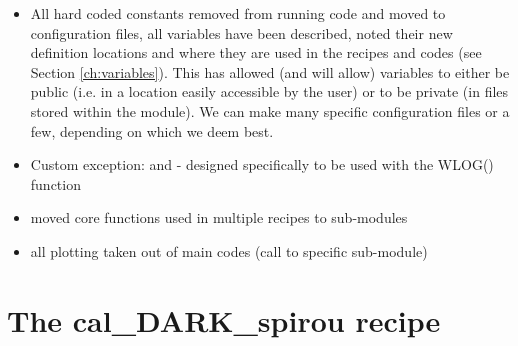 \begin{itemize}
\item All hard coded constants removed from running code and moved to configuration files, all variables have been described, noted their new definition locations and where they are used in the recipes and codes (see Section \ref{ch:variables}). This has allowed (and will allow) variables to either be public (i.e. in a location easily accessible by the user) or to be private (in files stored within the module). We can make many specific configuration files or a few, depending on which we deem best.

\item Custom exception:  and  - designed specifically to be used with the WLOG() function 

\item moved core functions used in multiple recipes to sub-modules

\item all plotting taken out of main codes (call to specific sub-module)

\end{itemize}

\section{The cal\_DARK\_spirou recipe}
\label{ch:changelog:At4:cal_DARK_spirou}

